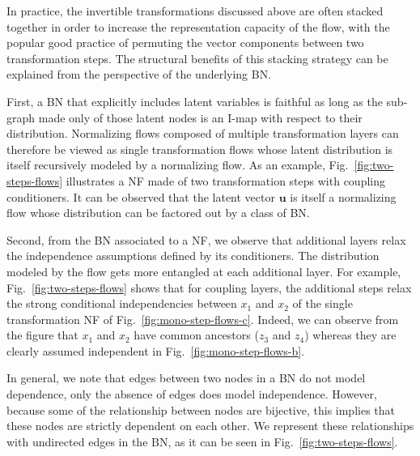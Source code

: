\documentclass{article}
\newcommand{\mb}{\boldsymbol}
\newcommand{\figref}[1]{Fig.~\ref{#1}}
\begin{document}
In practice, the invertible transformations discussed above are often stacked together in order to increase the representation capacity of the flow, with the popular good practice of permuting the vector components between two transformation steps.
The structural benefits of this stacking strategy can be explained from the perspective of the underlying BN.

First, a BN that explicitly includes latent variables is faithful as long as the sub-graph made only of those latent nodes is an I-map with respect to their distribution.
Normalizing flows composed of multiple transformation layers can therefore be viewed as single transformation flows whose latent distribution is itself recursively modeled by a normalizing flow.
As an example, \figref{fig:two-steps-flows} illustrates a NF made of two transformation steps with coupling conditioners. It can be observed that the latent vector $\mb{u}$ is itself a normalizing flow  whose distribution can be factored out by a class of BN. 

Second, from the BN associated to a NF, we observe that additional layers relax the independence assumptions defined by its conditioners.
The distribution modeled by the flow gets more entangled at each additional layer.
For example, \figref{fig:two-steps-flows} shows that for coupling layers, the additional steps relax the strong conditional independencies between $x_1$ and $x_2$ of the single transformation NF of \figref{fig:mono-step-flows-c}.
Indeed, we can observe from the figure that $x_1$ and $x_2$ have common ancestors ($z_3$ and $z_4$) whereas they are clearly assumed independent in \figref{fig:mono-step-flows-b}.

In general, we note that edges between two nodes in a BN do not model dependence, only the absence of edges does model independence. However, because some of the relationship between nodes are bijective, this implies that these nodes are strictly dependent on each other. We represent these relationships with undirected edges in the BN, as it can be seen in \figref{fig:two-steps-flows}. 
\end{document}
